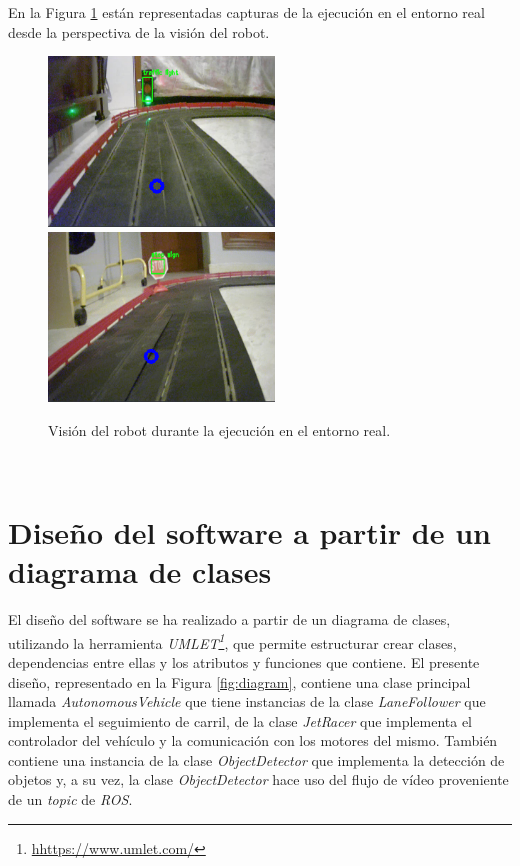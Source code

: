 En la Figura \ref{fig:screenshotsreal} están representadas capturas de la ejecución en el entorno real desde la perspectiva de la visión del robot.\\

\begin{figure} [h!]
	\begin{center}
		\includegraphics[width=6cm]{figs/screenshottrafficlight}\hspace{0.5cm}\includegraphics[width=6cm]{figs/screenshotstopsign}
	\end{center}
	\caption{Visión del robot durante la ejecución en el entorno real.}
	\label{fig:screenshotsreal}
\end{figure}\

\section{Diseño del software a partir de un diagrama de clases}
El diseño del software se ha realizado a partir de un diagrama de clases, utilizando la herramienta \textit{UMLET\footnote{\url{hhttps://www.umlet.com/}}}, que permite estructurar crear clases, dependencias entre ellas y los atributos y funciones que contiene. El presente diseño, representado en la Figura \ref{fig:diagram}, contiene una clase principal llamada \textit{AutonomousVehicle} que tiene instancias de la clase \textit{LaneFollower} que implementa el seguimiento de carril, de la clase \textit{JetRacer} que implementa el controlador del vehículo y la comunicación con los motores del mismo. También contiene una instancia de la clase \textit{ObjectDetector} que implementa la detección de objetos y, a su vez, la clase \textit{ObjectDetector} hace uso del flujo de vídeo proveniente de un \textit{topic} de \textit{ROS}.\\

